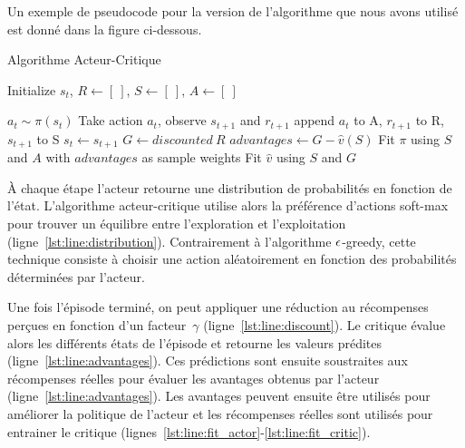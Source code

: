 Un exemple de pseudocode pour la version de l'algorithme que nous avons utilisé est donné dans la figure ci-dessous.
\begin{algorithm}
\caption{Algorithme Acteur-Critique}\label{alg:a2c}
\begin{algorithmic}[1]

\State Initialize $s_t$, $R \gets [~]$, $S \gets [~]$, $A \gets [~]$

\State $a_t \sim \pi(s_t)$  \label{lst:line:distribution}
  \State Take action $a_t$, observe $s_{t+1}$ and $r_{t+1}$
\State append $a_t$ to A, $r_{t+1}$ to R, $s_{t+1}$ to S
  \State $s_t \gets s_{t+1}$
\EndFor
\State $G \gets discounted~R$ \label{lst:line:discount}
\State $advantages \gets G - \hat{v}(S)$  \label{lst:line:advantages}
\State Fit $\pi$ using \(S\) and \(A\) with $advantages$ as sample weights \label{lst:line:fit_actor}
\State Fit $\hat{v}$ using \(S\) and \(G\) \label{lst:line:fit_critic}
\EndFor
\end{algorithmic}
\end{algorithm}

À chaque étape l'acteur retourne une distribution de probabilités en fonction de l'état.
L'algorithme acteur-critique utilise alors la préférence d'actions soft-max pour trouver un équilibre entre l'exploration et l'exploitation (ligne~\ref{lst:line:distribution}). 
Contrairement à l'algorithme $\large\epsilon$-greedy, cette technique consiste à choisir une action aléatoirement en fonction des probabilités déterminées par l'acteur. \cite{BartoSutton}

Une fois l'épisode terminé, on peut appliquer une réduction au récompenses perçues en fonction d'un facteur~$\gamma$ (ligne~\ref{lst:line:discount}).
Le critique évalue alors les différents états de l'épisode et retourne les valeurs prédites (ligne~\ref{lst:line:advantages}).
Ces prédictions sont ensuite soustraites aux récompenses réelles pour évaluer les avantages obtenus par l'acteur (ligne~\ref{lst:line:advantages}).
Les avantages peuvent ensuite être utilisés pour améliorer la politique de l'acteur et les récompenses réelles sont utilisés pour 
entrainer le critique (lignes~\ref{lst:line:fit_actor}-\ref{lst:line:fit_critic}).
